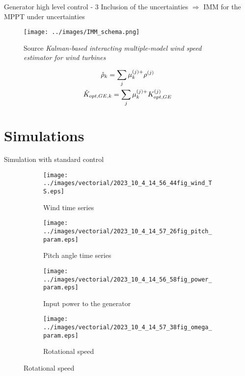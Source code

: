 \begin{frame}{Generator high level control - 3}
  Inclusion of the uncertainties $\Rightarrow$ IMM for the MPPT under uncertainties\\

  \begin{figure}[H]
    \centering
    \texttt{[image: ../images/IMM\_schema.png]}
    \caption{Source \textit{Kalman-based interacting multiple-model wind speed estimator for wind turbines}}
  \end{figure}
  \begin{gather}
    \notag
    \hat{\rho}_{k} = \sum_j \mu_k^{(j)+} \rho^{(j)}\\ \notag
    \hat{K}_{opt,GE,k} = \sum_j \mu_k^{(j)+} K_{opt,GE}^{(j)} 
  \end{gather}

\end{frame}

                                                        
\section{Simulations}
\begin{frame}{Simulation with standard control}
  \begin{figure}[!htbp]
    \begin{subfigure}{0.49\columnwidth}
      \centering
      \texttt{[image: ../images/vectorial/2023\_10\_4\_14\_56\_44fig\_wind\_TS.eps]}
      \caption{Wind time series}
    \end{subfigure}
    \begin{subfigure}{0.49\columnwidth}
      \centering
      \texttt{[image: ../images/vectorial/2023\_10\_4\_14\_57\_26fig\_pitch\_param.eps]}
      \caption{Pitch angle time series}
    \end{subfigure}
    \begin{subfigure}{0.49\columnwidth}
      \centering
      \texttt{[image: ../images/vectorial/2023\_10\_4\_14\_56\_58fig\_power\_param.eps]}
      \caption{Input power to the generator}
    \end{subfigure}
    \begin{subfigure}{0.49\columnwidth}
      \centering
      \texttt{[image: ../images/vectorial/2023\_10\_4\_14\_57\_38fig\_omega\_param.eps]}
      \caption{Rotational speed}
    \end{subfigure}
  \end{figure}
\end{frame}

